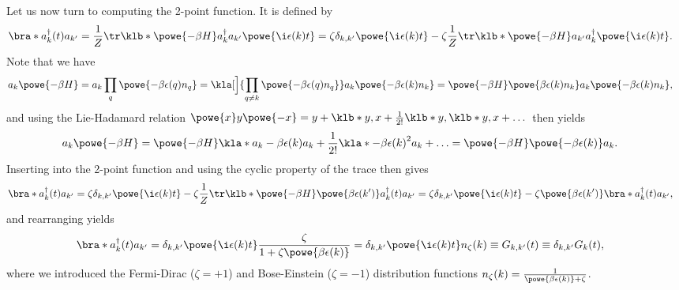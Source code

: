 \documentclass[english, parskip=full]{scrartcl}
\begin{document}
Let us now turn to computing the 2-point function.
It is defined by
\begin{align}
\bra*{a_k^\dagger(t) a_{k'}} &= \frac{1}{Z} \tr \klb*{\powe{-\beta H} a_k^\dagger a_{k'}} \powe{\i\epsilon(k) t} = \zeta \delta_{k,k'} \powe{\i\epsilon(k) t} - \zeta \frac{1}{Z} \tr \klb*{\powe{-\beta H} a_{k'} a_k^\dagger} \powe{\i\epsilon(k) t}.
\end{align}
Note that we have
\begin{align}
a_k\powe{-\beta H} &= a_k \prod_q \powe{-\beta \epsilon(q) n_q} = \kla[\Big]{\prod_{q\neq k} \powe{-\beta \epsilon(q) n_q}} a_k \powe{-\beta \epsilon(k)n_k} = \powe{-\beta H} \powe{\beta \epsilon(k)n_k}a_k \powe{-\beta \epsilon(k)n_k},
\end{align}
and using the Lie-Hadamard relation $\powe{x}y\powe{-x} = y + \klb*{y,x} + \frac{1}{2!} \klb*{y,\klb*{y,x}} + \dots$ then yields
\begin{align}
a_k\powe{-\beta H} &= \powe{-\beta H} \kla*{a_k - \beta \epsilon(k)a_k + \frac{1}{2!} \kla*{-\beta\epsilon(k)}^2 a_k + \dots} = \powe{-\beta H} \powe{-\beta\epsilon(k)} a_k.
\end{align}
Inserting into the 2-point function and using the cyclic property of the trace then gives
\begin{align}
\bra*{a_k^\dagger(t) a_{k'}} &= \zeta\delta_{k,k'} \powe{\i\epsilon(k)t} - \zeta \frac{1}{Z} \tr\klb*{\powe{-\beta H} \powe{\beta \epsilon(k')} a_k^\dagger(t) a_{k'}} = \zeta \delta_{k,k'} \powe{\i\epsilon(k)t} - \zeta \powe{\beta\epsilon(k')} \bra*{a_k^\dagger(t) a_{k'}},
\end{align}
and rearranging yields
\begin{align}
\bra*{a_k^\dagger(t) a_{k'}} &= \delta_{k,k'} \powe{\i\epsilon(k) t} \frac{\zeta}{1 + \zeta \powe{\beta \epsilon(k)}} = \delta_{k,k'} \powe{\i\epsilon(k) t} n_\zeta(k) \equiv G_{k,k'}(t) \equiv \delta_{k,k'} G_k(t),
\end{align}
where we introduced the Fermi-Dirac ($\zeta=+1$) and Bose-Einstein ($\zeta=-1$) distribution functions $n_\zeta(k) = \frac{1}{\powe{\beta \epsilon(k)} + \zeta}$.
\end{document}
